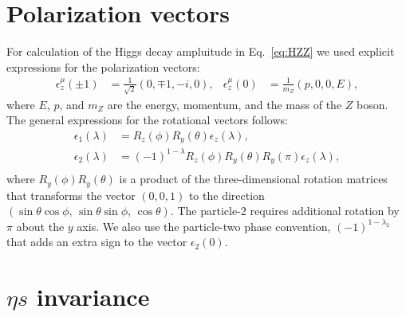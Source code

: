 \documentclass[prd,preprintnumbers,floatfix,
nofootinbib,superscriptaddress]{revtex4}
\begin{document}
\section{Polarization vectors}

For calculation of the Higgs decay ampluitude in Eq.~\eqref{eq:HZZ}
we used explicit expressions for the polarization vectors:
\begin{align}
  \epsilon_z^{\mu}(\pm1) &= \frac{1}{\sqrt{2}} \left( 0,\mp 1,-i,0 \right), &
  \epsilon_z^{\mu}(0) &= \frac{1}{m_Z} \left(p,0,0,E\right),
\end{align}
where $E$, $p$, and $m_Z$ are the energy, momentum, and the mass of the $Z$ boson.
The general expressions for the rotational vectors follows:
\begin{align}
  \epsilon_1(\lambda) &= R_z(\phi) R_y(\theta) \epsilon_z(\lambda),\\
  \epsilon_2(\lambda) &= (-1)^{1-\lambda} R_z(\phi) R_y(\theta) R_y(\pi) \epsilon_z(\lambda),\\
\end{align}
where $R_y(\phi)R_y(\theta)$ is a product of the three-dimensional rotation matrices
that transforms the vector $(0,0,1)$ to the direction $(\sin\theta\cos\phi,\,\sin\theta\sin\phi,\,\cos\theta)$.
The particle-2 requires additional rotation by $\pi$ about the $y$ axis. We also use the particle-two phase convention,
$(-1)^{1-\lambda_2}$ that adds an extra sign to the vector $\epsilon_2(0)$.

\section{$\eta s$ invariance}
\end{document}
